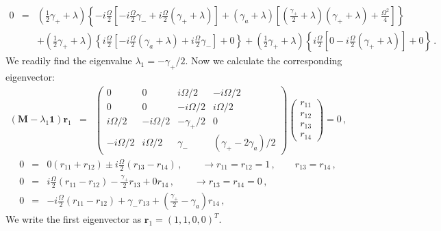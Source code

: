 \documentclass[twocolumn,aps,eqsecnum,showkeys,amsmath]{revtex4-2}
\begin{document}
\begin{widetext}
%
\begin{eqnarray*} 	
0 &=& (\frac{1}{2} \gamma_+ +\lambda) \left\{ - i \frac{\Omega}{2} 
	\left[  - i \frac{\Omega}{2} \gamma_-   
	+i \frac{\Omega}{2} (\gamma_+ +\lambda)  \right] 
	+(\gamma_a +\lambda) \left[ (\frac{\gamma_+}{2} +\lambda) 
	(\gamma_+ +\lambda) +\frac{\Omega^2}{4} \right] \right\}  		\\ 
%
&& +(\frac{1}{2} \gamma_+ +\lambda) \left\{ i \frac{\Omega}{2} 
	\left[  - i \frac{\Omega}{2} (\gamma_a +\lambda)    
	+i \frac{\Omega}{2} \gamma_-  \right] +0 \right\} 
+(\frac{1}{2} \gamma_+ +\lambda) \left\{ i \frac{\Omega}{2} 
	\left[ 0 - i \frac{\Omega}{2} (\gamma_+ +\lambda) \right] +0 \right\} \,.
\end{eqnarray*}
We readily find the eigenvalue $\lambda_1 =-\gamma_+/2$. 
Now we calculate the corresponding eigenvector: 
%
\begin{eqnarray*} 	
( \mathbf{M} -\lambda_1 \mathbf{1} ) \mathbf{r}_1 
&=& \left( \begin{array}{cccc}
	0 & 0 & i\Omega/2 & -i\Omega/2 \\ 
	0 & 0 & -i\Omega/2 & i\Omega/2 	 \\ 
	i\Omega/2 & -i\Omega/2 & -\gamma_+/2 & 0 		\\ 
	-i\Omega/2 & i\Omega/2 & \gamma_- & (\gamma_+ -2\gamma_a)/2 
	\end{array}  \right) 
\left( \begin{array}{c}  r_{11} \\ r_{12} \\ r_{13} \\ r_{14} 	\end{array}  \right)  
	= 0 \,,  	
\end{eqnarray*}
%
\begin{eqnarray*} 	
0 &=& 0(r_{11} +r_{12}) \pm i \frac{\Omega}{2} ( r_{13} -r_{14} ) \,, 
	\qquad \to r_{11} = r_{12} =1 \,, \qquad r_{13} = r_{14} \,,	\\ 
0 &=& i\frac{\Omega}{2} ( r_{11} -r_{12} ) -\frac{\gamma_+}{2} r_{13} +0 r_{14} \,, 
	\qquad \to r_{13} =r_{14} =0 \,, 	\\
0 &=& -i\frac{\Omega}{2} ( r_{11} -r_{12} ) +\gamma_- r_{13} 
	+ (\frac{\gamma_+}{2} -\gamma_a) r_{14} \,,
\end{eqnarray*}
We write the first eigenvector as $\mathbf{r}_1 =(1,1,0,0)^T$.  


\end{widetext}
\end{document}

